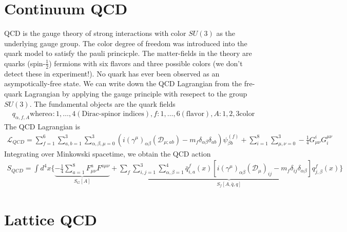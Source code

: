 \section{Continuum QCD}
QCD is the gauge theory of strong interactions with color $SU(3)$ as the underlying gauge group. The color degree of freedom was introduced into the quark model to satisfy the pauli princicple. The matter-fields in the theory are quarks (spin-$\frac{1}{2}$) fermions with six flavors and three possible colors (we don't detect these in experiment!). No quark has ever been observed as an asympotically-free state. We can write down the QCD Lagrangian from the fre-quark Lagrangian by applying the gauge principle with resepect to the group $SU(3)$. The fundamental objects are the quark fields 
\begin{align}
    q_{\alpha,f,A} \text{where} \alpha: 1,\dots,4 (\text{Dirac-spinor indices}), f: 1,\dots,6 (\text{flavor}), A: 1,2,3 \text{color}
\end{align}
The QCD Lagrangian is 
\begin{align}
    \mathcal{L}_{QCD} = \sum_{f=1}^{6} \sum_{a,b=1}^{3} \sum_{\alpha,\beta,\mu=0}^{3} (i(\gamma^\mu)_{\alpha\beta}(\mathcal{D}_{\mu;ab}) - m_f\delta_{\alpha\beta}\delta_{ab}) \psi_{\beta b}^{(f)} + \sum_{i=1}^{8}\sum_{\mu,\nu=0}^{3} -\frac{1}{4} G_{\mu\nu}^i G_i^{\mu\nu}
\end{align}
Integrating over Minkowski spacetime, we obtain the QCD action 
\begin{align}
    S_{QCD} = \int d^4x \{\underbrace{-\frac{1}{4} \sum_{a=1}^{8}F_{\mu\nu}^a F^{a\mu\nu}}_{S_G[A]}+ \underbrace{\sum_{f}\sum_{i,j=1}^{3}\sum_{\alpha,\beta=1}^{4}\bar{q}_{i,a}^f(x)[i(\gamma^\mu)_{\alpha\beta}(\mathcal{D}_\mu)_{ij} - m_f\delta_{ij}\delta_{\alpha\beta}]q_{j,\beta}^f(x)}_{S_f[A,\bar{q},q]}\}
\end{align}
 

\section{Lattice QCD }

